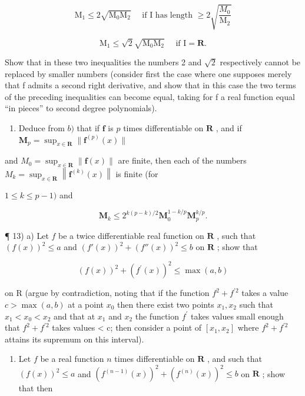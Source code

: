\[
\mathrm{M} _ {1} \leqslant 2 \sqrt {\mathrm{M} _ {0} \mathrm{M} _ {2}} \quad \text { if   I   has   length } \geqslant 2 \sqrt {\frac {M _ {0}}{\mathrm{M} _ {2}}}
\]

\[
\mathrm{M} _ {1} \leqslant \sqrt {2} \sqrt {\mathrm{M} _ {0} \mathrm{M} _ {2}} \quad \text { if } \mathrm{I} = \mathbf {R}.
\]

Show that in these two inequalities the numbers 2 and \(\sqrt{2}\) respectively cannot be replaced by smaller numbers (consider first the case where one supposes merely that f admits a second right derivative, and show that in this case the two terms of the preceding inequalities can become equal, taking for f a real function equal ``in pieces'' to second degree polynomials).

\begin{enumerate}
\def\labelenumi{\alph{enumi})}
\setcounter{enumi}{2}
\tightlist
\item
  Deduce from \(b)\) that if \(\mathbf{f}\) is \(p\) times differentiable on \(\mathbf{R}\) , and if \(\mathbf{M}_p = \sup_{x \in \mathbf{R}} \| \mathbf{f}^{(p)}(x) \|\)
\end{enumerate}

and \(M_{0}=\sup_{x\in\mathbf{R}}\|\mathbf{f}(x)\|\) are finite, then each of the numbers \(M_{k}=\sup_{x\in\mathbf{R}}\left\|\mathbf{f}^{(k)}(x)\right\|\) is finite (for

\(1 \leqslant k \leqslant p - 1)\) and

\[
\mathbf {M} _ {k} \leqslant 2 ^ {k (p - k) / 2} \mathbf {M} _ {0} ^ {1 - k / p} \mathbf {M} _ {p} ^ {k / p}.
\]

¶ 13) a) Let \(f\) be a twice differentiable real function on \(\mathbf{R}\) , such that \((f(x))^2 \leqslant a\) and \((f'(x))^2 + (f''(x))^2 \leqslant b\) on \(\mathbf{R}\) ; show that

\[
(f (x)) ^ {2} + \left(f ^ {\prime} (x)\right) ^ {2} \leqslant \max (a, b)
\]

on R (argue by contradiction, noting that if the function \(f^{2}+f^{\prime2}\) takes a value \(c > \max(a, b)\) at a point \(x_{0}\) then there exist two points \(x_{1}, x_{2}\) such that \(x_{1} < x_{0} < x_{2}\) and that at \(x_{1}\) and \(x_{2}\) the function \(f^{\prime}\) takes values small enough that \(f^{2} + f^{\prime2}\) takes values \textless{} c; then consider a point of \([x_{1}, x_{2}]\) where \(f^{2} + f^{\prime2}\) attains its supremum on this interval).

\begin{enumerate}
\def\labelenumi{\alph{enumi})}
\setcounter{enumi}{1}
\tightlist
\item
  Let \(f\) be a real function \(n\) times differentiable on \(\mathbf{R}\) , and such that \((f(x))^2 \leqslant a\) and \((f^{(n - 1)}(x))^2 + (f^{(n)}(x))^2 \leqslant b\) on \(\mathbf{R}\) ; show that then
\end{enumerate}

